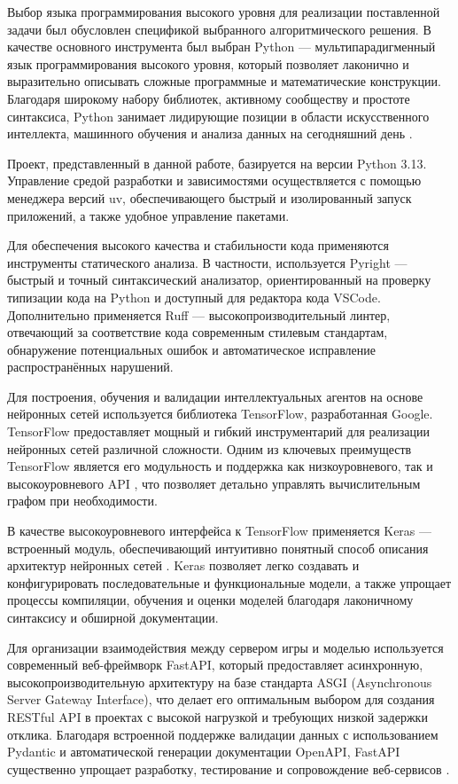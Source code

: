 Выбор языка программирования высокого уровня для реализации поставленной задачи был обусловлен спецификой выбранного алгоритмического решения. В качестве основного инструмента был выбран Python --- мультипарадигменный язык программирования высокого уровня, который позволяет лаконично и выразительно описывать сложные программные и математические конструкции. Благодаря широкому набору библиотек, активному сообществу и простоте синтаксиса, Python занимает лидирующие позиции в области искусственного интеллекта, машинного обучения и анализа данных на сегодняшний день \cite{programming-languages-rating}.

Проект, представленный в данной работе, базируется на версии Python 3.13. Управление средой разработки и зависимостями осуществляется с помощью менеджера версий uv, обеспечивающего быстрый и изолированный запуск приложений, а также удобное управление пакетами.

Для обеспечения высокого качества и стабильности кода применяются инструменты статического анализа. В частности, используется Pyright --- быстрый и точный синтаксический анализатор, ориентированный на проверку типизации кода на Python и доступный для редактора кода VSCode. Дополнительно применяется Ruff --- высокопроизводительный линтер, отвечающий за соответствие кода современным стилевым стандартам, обнаружение потенциальных ошибок и автоматическое исправление распространённых нарушений.

Для построения, обучения и валидации интеллектуальных агентов на основе нейронных сетей используется библиотека TensorFlow, разработанная Google. TensorFlow предоставляет мощный и гибкий инструментарий для реализации нейронных сетей различной сложности. Одним из ключевых преимуществ TensorFlow является его модульность и поддержка как низкоуровневого, так и высокоуровневого API \cite{tensorflow-api}, что позволяет детально управлять вычислительным графом при необходимости.

В качестве высокоуровневого интерфейса к TensorFlow применяется Keras --- встроенный модуль, обеспечивающий интуитивно понятный способ описания архитектур нейронных сетей \cite{keras-api}. Keras позволяет легко создавать и конфигурировать последовательные и функциональные модели, а также упрощает процессы компиляции, обучения и оценки моделей благодаря лаконичному синтаксису и обширной документации.

Для организации взаимодействия между сервером игры и моделью используется современный веб-фреймворк FastAPI, который предоставляет асинхронную, высокопроизводительную архитектуру на базе стандарта ASGI (Asynchronous Server Gateway Interface), что делает его оптимальным выбором для создания RESTful API в проектах с высокой нагрузкой и требующих низкой задержки отклика. Благодаря встроенной поддержке валидации данных с использованием Pydantic и автоматической генерации документации OpenAPI, FastAPI существенно упрощает разработку, тестирование и сопровождение веб-сервисов \cite{fastapi-api}.

